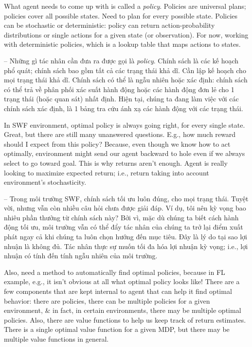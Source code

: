\documentclass{article}
\begin{document}
\begin{itemize}
\begin{itemize}
        What agent needs to come up with is called a {\it policy}. Policies are universal plans; policies cover all possible states. Need to plan for every possible state. Policies can be stochastic or deterministic: policy can return action-probability distributions or single actions for a given state (or observation). For now, working with deterministic policies, which is a lookup table that maps actions to states.

        -- Những gì tác nhân cần đưa ra được gọi là {\it policy}. Chính sách là các kế hoạch phổ quát; chính sách bao gồm tất cả các trạng thái khả dĩ. Cần lập kế hoạch cho mọi trạng thái khả dĩ. Chính sách có thể là ngẫu nhiên hoặc xác định: chính sách có thể trả về phân phối xác suất hành động hoặc các hành động đơn lẻ cho 1 trạng thái (hoặc quan sát) nhất định. Hiện tại, chúng ta đang làm việc với các chính sách xác định, là 1 bảng tra cứu ánh xạ các hành động với các trạng thái.

        In SWF environment, optimal policy is always going right, for every single state. Great, but there are still many unanswered questions. E.g., how much reward should I expect from this policy? Because, even though we know how to act optimally, environment might send our agent backward to hole even if we always select to go toward goal. This is why returns aren't enough. Agent is really looking to maximize expected return; i.e., return taking into account environment's stochasticity.

        -- Trong môi trường SWF, chính sách tối ưu luôn đúng, cho mọi trạng thái. Tuyệt vời, nhưng vẫn còn nhiều câu hỏi chưa được giải đáp. Ví dụ, tôi nên kỳ vọng bao nhiêu phần thưởng từ chính sách này? Bởi vì, mặc dù chúng ta biết cách hành động tối ưu, môi trường vẫn có thể đẩy tác nhân của chúng ta trở lại điểm xuất phát ngay cả khi chúng ta luôn chọn hướng đến mục tiêu. Đây là lý do tại sao lợi nhuận là không đủ. Tác nhân thực sự muốn tối đa hóa lợi nhuận kỳ vọng; i.e., lợi nhuận có tính đến tính ngẫu nhiên của môi trường.

        Also, need a method to automatically find optimal policies, because in FL example, e.g., it isn't obvious at all what optimal policy looks like! There are a few components that are kept internal to agent that can help it find optimal behavior: there are policies, there can be multiple policies for a given environment, \& in fact, in certain environments, there may be multiple optimal policies. Also, there are value functions to help us keep track of return estimates. There is a single optimal value function for a given MDP, but there may be multiple value functions in general.


\end{itemize}
\end{itemize}
\end{document}
